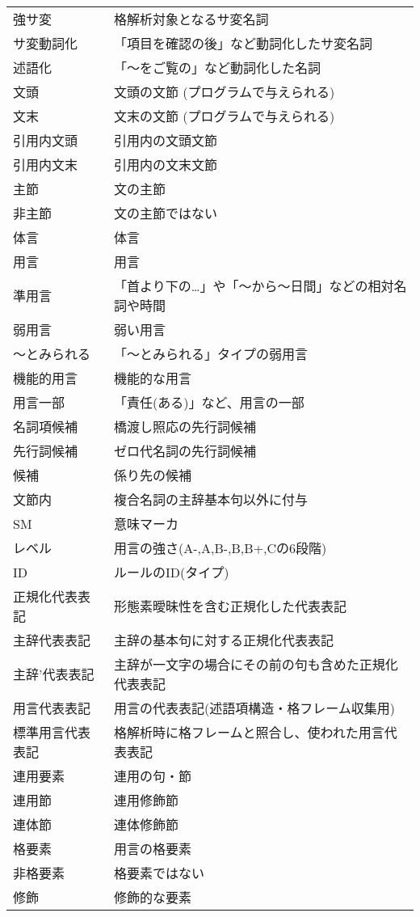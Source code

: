 \documentclass[a4j]{jarticle}
\begin{document}
\begin{supertabular}{p{4.2cm}p{9.6cm}}
強サ変 & 格解析対象となるサ変名詞\\
サ変動詞化 & 「項目を確認の後」など動詞化したサ変名詞\\
述語化 & 「〜をご覧の」など動詞化した名詞\\
文頭 & 文頭の文節 (プログラムで与えられる)\\
文末 & 文末の文節 (プログラムで与えられる)\\
引用内文頭 & 引用内の文頭文節\\
引用内文末 & 引用内の文末文節\\
主節 & 文の主節\\
非主節 & 文の主節ではない\\
体言 & 体言\\
用言 & 用言\\
準用言 & 「首より下の…」や「〜から〜日間」などの相対名詞や時間\\
弱用言 & 弱い用言\\
〜とみられる & 「〜とみられる」タイプの弱用言\\
機能的用言 & 機能的な用言\\
用言一部 & 「責任(ある)」など、用言の一部\\
名詞項候補 & 橋渡し照応の先行詞候補\\
先行詞候補 & ゼロ代名詞の先行詞候補\\
候補 & 係り先の候補\\
文節内 & 複合名詞の主辞基本句以外に付与\\
SM & 意味マーカ\\
レベル & 用言の強さ(A-,A,B-,B,B+,Cの6段階)\\
ID & ルールのID(タイプ)\\
正規化代表表記 & 形態素曖昧性を含む正規化した代表表記\\
主辞代表表記 & 主辞の基本句に対する正規化代表表記\\
主辞’代表表記 & 主辞が一文字の場合にその前の句も含めた正規化代表表記\\
用言代表表記 & 用言の代表表記(述語項構造・格フレーム収集用)\\
標準用言代表表記 & 格解析時に格フレームと照合し、使われた用言代表表記\\
連用要素 & 連用の句・節\\
連用節 & 連用修飾節\\
連体節 & 連体修飾節\\
格要素 & 用言の格要素\\
非格要素 & 格要素ではない\\
修飾 & 修飾的な要素\\

\end{supertabular}
\end{document}
